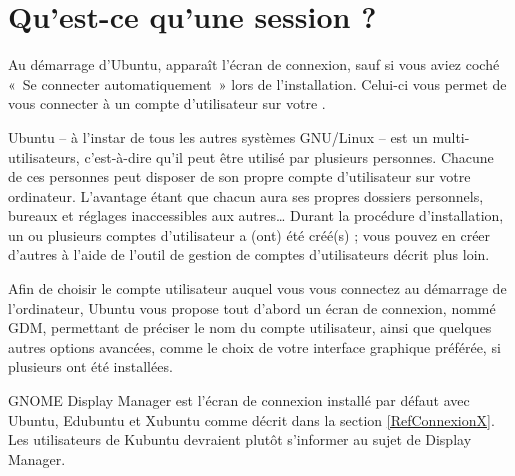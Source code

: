 \section{Qu'est-ce qu'une session ?}
\label{PremiereConnexion}
Au démarrage d'Ubuntu, apparaît l'écran de connexion, sauf si vous aviez coché «~Se connecter automatiquement~» lors de l'installation. Celui-ci vous permet de vous connecter à un compte d'utilisateur sur votre .\par
{}
Ubuntu -- à l'instar de tous les autres systèmes GNU/Linux -- est un  multi-utilisateurs, c'est-à-dire qu'il peut être utilisé par plusieurs personnes. Chacune de ces personnes peut disposer de son propre compte d'utilisateur sur votre ordinateur. L'avantage étant que chacun aura ses propres dossiers personnels, bureaux et réglages inaccessibles aux autres\ldots{} Durant la procédure d'installation, un ou plusieurs comptes d'utilisateur a (ont) été créé(s) ; vous pouvez en créer d'autres à l'aide de l'outil de gestion de comptes d'utilisateurs décrit plus loin.\par 
Afin de choisir le compte utilisateur auquel vous vous connectez au démarrage de l'ordinateur, Ubuntu vous propose tout d'abord un écran de connexion, nommé GDM, permettant de préciser le nom du compte utilisateur, ainsi que quelques autres options avancées, comme le choix de votre interface graphique préférée, si plusieurs ont été installées.\par
\begin{nota}
GNOME Display Manager est l'écran de connexion installé par défaut avec Ubuntu, Edubuntu et Xubuntu comme décrit dans la section \ref{RefConnexionX}. Les utilisateurs de Kubuntu devraient plutôt s'informer au sujet de  Display Manager.
\end{nota}
